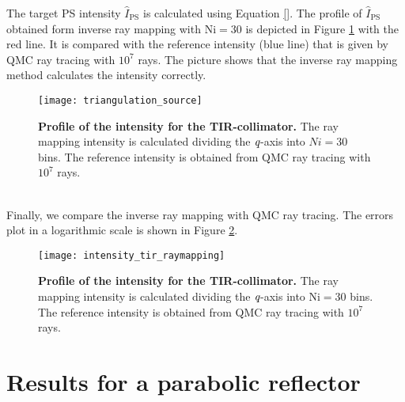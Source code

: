 \indent The target PS intensity $\hat{I}_{\textrm{PS}}$ is calculated using Equation \ref{}. The profile of $\hat{I}_{\textrm{PS}}$ obtained form inverse ray mapping with $\textrm{Ni}=30$ is depicted in Figure \ref{fig:intensity_tir_raymapping} with the red line. It is compared with the reference intensity (blue line) that is given by QMC ray tracing with $10^7$ rays. The picture shows that the inverse ray mapping method calculates the intensity correctly.
\begin{figure}[t]
  \begin{center}
  \texttt{[image: triangulation\_source]}
  \end{center}
  \caption{\textbf{Profile of the intensity for the TIR-collimator.}
 The ray mapping intensity is calculated dividing the $\textit{q}$-axis into $\textit{Ni}=30$ bins. The reference intensity is obtained from QMC ray tracing with $10^7$ rays.}
\label{fig:intensity_tir_raymapping}
 \end{figure}
\\ \indent 
Finally, we compare the inverse ray mapping with QMC ray tracing. The errors plot in a logarithmic scale is shown in Figure \ref{fig:error_tir_raymapping}.
\begin{figure}[t]
  \begin{center}
  \texttt{[image: intensity\_tir\_raymapping]}
  \end{center}
  \caption{\textbf{Profile of the intensity for the TIR-collimator.}
 The ray mapping intensity is calculated dividing the $\textit{q}$-axis into $\textrm{Ni}=30$ bins. The reference intensity is obtained from QMC ray tracing with $10^7$ rays.}
\label{fig:error_tir_raymapping}
 \end{figure}
\section{Results for a parabolic reflector}\label{sec:PR}
